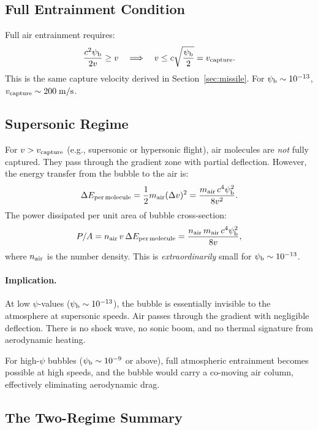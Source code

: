 \documentclass[12pt,aps,prd,superscriptaddress,nofootinbib]{revtex4-2}
\newcommand{\psib}{\psi_{\rm b}}
\begin{document}
\subsection{Full Entrainment Condition}

Full air entrainment requires:
\begin{equation}
\frac{c^2\psib}{2v} \geq v
\quad\Longrightarrow\quad
v \leq c\sqrt{\frac{\psib}{2}} = v_{\rm capture}.
\end{equation}
This is the same capture velocity derived in
Section~\ref{sec:missile}. For $\psib \sim 10^{-13}$,
$v_{\rm capture} \sim 200\;\si{m/s}$.

\subsection{Supersonic Regime}

For $v > v_{\rm capture}$ (e.g., supersonic or hypersonic flight),
air molecules are \emph{not} fully captured. They pass through the
gradient zone with partial deflection. However, the energy transfer
from the bubble to the air is:
\begin{equation}
\Delta E_{\rm per\,molecule} = \frac{1}{2}m_{\rm air}(\Delta v)^2
= \frac{m_{\rm air}\,c^4\psib^2}{8v^2}.
\end{equation}
The power dissipated per unit area of bubble cross-section:
\begin{equation}
P/A = n_{\rm air}\,v\,\Delta E_{\rm per\,molecule}
= \frac{n_{\rm air}\,m_{\rm air}\,c^4\psib^2}{8v},
\end{equation}
where $n_{\rm air}$ is the number density. This is
\emph{extraordinarily} small for $\psib \sim 10^{-13}$.

\paragraph{Implication.}
At low $\psi$-values ($\psib \sim 10^{-13}$), the bubble is
essentially invisible to the atmosphere at supersonic speeds.
Air passes through the gradient with negligible deflection.
There is no shock wave, no sonic boom, and no thermal signature
from aerodynamic heating.

For high-$\psi$ bubbles ($\psib \sim 10^{-9}$ or above), full
atmospheric entrainment becomes possible at high speeds, and
the bubble would carry a co-moving air column, effectively
eliminating aerodynamic drag.

\subsection{The Two-Regime Summary}
\end{document}
